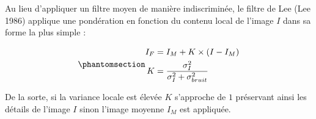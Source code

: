 \documentclass[
  11pt,
  letterpaper,
  open=any,
  twoside=false,
  french]{scrbook}
\begin{document}
Au lieu d'appliquer un filtre moyen de manière indiscriminée, le filtre
de Lee (Lee 1986) applique une pondération en fonction du contenu local
de l'image \(I\) dans sa forme la plus simple :

\begin{equation}\phantomsection\label{eq-lee-filter}{ 
\begin{aligned}
I_F & = I_M + K \times (I - I_M) \\
K & = \frac{\sigma^2_I}{\sigma^2_I + \sigma^2_{bruit}}
\end{aligned}
}\end{equation}

De la sorte, si la variance locale est élevée \(K\) s'approche de \(1\)
préservant ainsi les détails de l'image \(I\) sinon l'image moyenne
\(I_M\) est appliquée.
\end{document}
